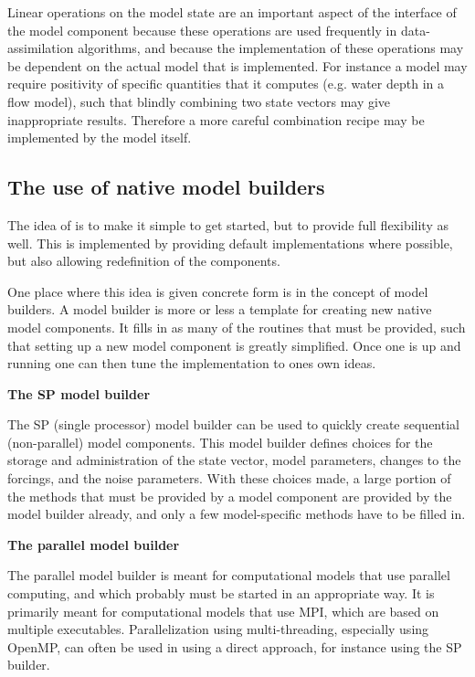 Linear operations on the model state are an important aspect of the interface of the model component because these operations are used frequently in data-assimilation algorithms, and because the implementation of these operations may be dependent on the actual model that is implemented. For instance a model may require positivity of specific quantities that it computes (e.g. water depth in a flow model), such that blindly combining two state vectors may give inappropriate results. Therefore a more careful combination recipe may be implemented by the model itself. 

\subsection{The use of native model builders}

The idea of \oda is to make it simple to get started, but to provide full flexibility as well. This is implemented by providing default implementations where possible, but also allowing redefinition of the \oda components.

One place where this idea is given concrete form is in the concept of model builders. A model builder is more or less a template for creating new native model components. It fills in as many of the routines that must be provided, such that setting up a new model component is greatly simplified. Once one is up and running one can then tune the implementation to ones own ideas.

\textbf{The SP model builder}

The SP (single processor) model builder can be used to quickly create sequential (non-parallel) model components. This model builder defines choices for the storage and administration of the state vector, model parameters, changes to the forcings, and the noise parameters. With these choices made, a large portion of the methods that must be provided by a model component are provided by the model builder already, and only a few model-specific methods have to be filled in.

\textbf{The parallel model builder}

The parallel model builder is meant for computational models that use parallel computing, and which probably must be started in an appropriate way. It is primarily meant for computational models that use MPI, which are based on multiple executables. Parallelization using multi-threading, especially using OpenMP, can often be used in \oda using a direct approach, for instance using the SP builder.

